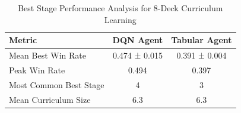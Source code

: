 \begin{table}[h!]
\centering
\caption{Best Stage Performance Analysis for 8-Deck Curriculum Learning}
\label{tab:best_performance_8deck}
\begin{tabular}{lcc}
\hline
Metric & DQN Agent & Tabular Agent \\
\hline
Mean Best Win Rate & 0.474 ± 0.015 & 0.391 ± 0.004 \\
Peak Win Rate & 0.494 & 0.397 \\
Most Common Best Stage & 4 & 3 \\
Mean Curriculum Size & 6.3 & 6.3 \\
\hline
\end{tabular}
\end{table}

